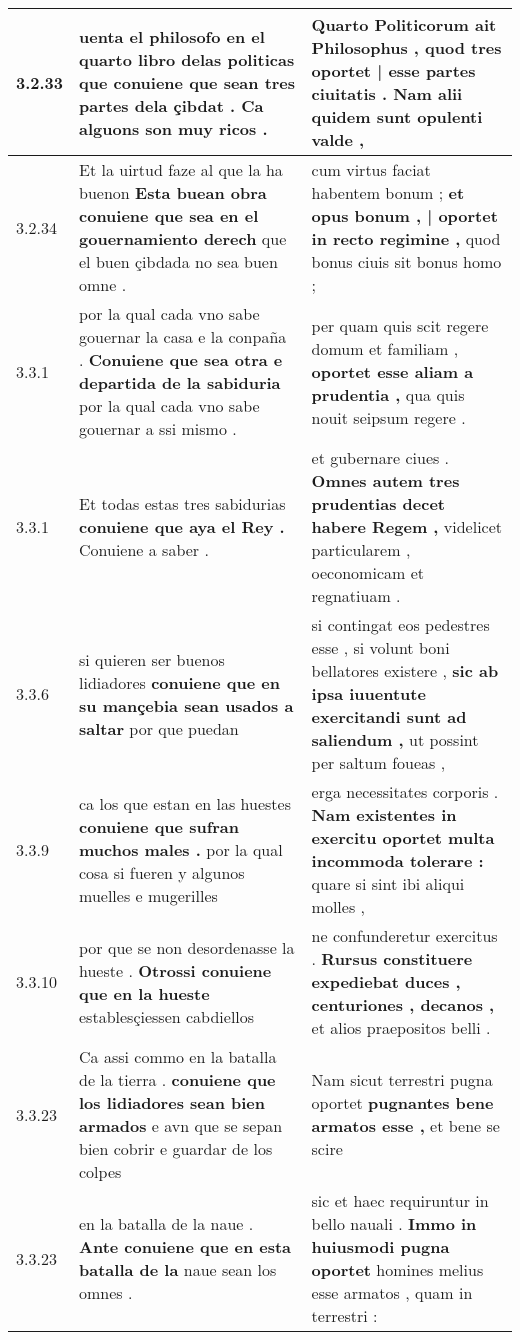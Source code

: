 \begin{tabular}{|p{1cm}|p{6.5cm}|p{6.5cm}|}
3.2.33 & uenta el philosofo en el quarto libro delas politicas \textbf{ que conuiene que sean tres partes dela çibdat . } Ca alguons son muy ricos . & Quarto Politicorum ait Philosophus , \textbf{ quod tres oportet | esse partes ciuitatis . } Nam alii quidem sunt opulenti valde , \\\hline
3.2.34 & Et la uirtud faze al que la ha buenon \textbf{ Esta buean obra conuiene que sea en el gouernamiento derech } que el buen çibdada no sea buen omne . & cum virtus faciat habentem bonum ; \textbf{ et opus bonum , | oportet in recto regimine , } quod bonus ciuis sit bonus homo ; \\\hline
3.3.1 & por la qual cada vno sabe gouernar la casa e la conpaña . \textbf{ Conuiene que sea otra e departida de la sabiduria } por la qual cada vno sabe gouernar a ssi mismo . & per quam quis scit regere domum et familiam , \textbf{ oportet esse aliam a prudentia , } qua quis nouit seipsum regere . \\\hline
3.3.1 & Et todas estas tres sabidurias \textbf{ conuiene que aya el Rey . } Conuiene a saber . & et gubernare ciues . \textbf{ Omnes autem tres prudentias decet habere Regem , } videlicet particularem , oeconomicam et regnatiuam . \\\hline
3.3.6 & si quieren ser buenos lidiadores \textbf{ conuiene que en su mançebia sean usados a saltar } por que puedan & si contingat eos pedestres esse , si volunt boni bellatores existere , \textbf{ sic ab ipsa iuuentute exercitandi sunt ad saliendum , } ut possint per saltum foueas , \\\hline
3.3.9 & ca los que estan en las huestes \textbf{ conuiene que sufran muchos males . } por la qual cosa si fueren y algunos muelles e mugerilles & erga necessitates corporis . \textbf{ Nam existentes in exercitu oportet multa incommoda tolerare : } quare si sint ibi aliqui molles , \\\hline
3.3.10 & por que se non desordenasse la hueste . \textbf{ Otrossi conuiene que en la hueste } establesçiessen cabdiellos & ne confunderetur exercitus . \textbf{ Rursus constituere expediebat duces , centuriones , decanos , } et alios praepositos belli . \\\hline
3.3.23 & Ca assi commo en la batalla de la tierra . \textbf{ conuiene que los lidiadores sean bien armados } e avn que se sepan bien cobrir e guardar de los colpes & Nam sicut terrestri pugna oportet \textbf{ pugnantes bene armatos esse , } et bene se scire \\\hline
3.3.23 & en la batalla de la naue . \textbf{ Ante conuiene que en esta batalla de la } naue sean los omnes . & sic et haec requiruntur in bello nauali . \textbf{ Immo in huiusmodi pugna oportet } homines melius esse armatos , quam in terrestri : \\\hline

\end{tabular}
